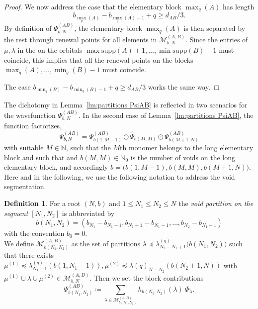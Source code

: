 \documentclass[letterpaper, DIV=17]{scrartcl}
\numberwithin{equation}{section}
\theoremstyle{definition}
\newtheorem{defn}{Definition}[section]
\begin{document}
\begin{proof}
	We now address the case that the elementary block $ \max_q(A) $ has length
	$$ b_{\max_q(A)}-b_{\max_q(A)-1}+q\geq d_{AB}/3. $$
	By definition of $\Psi_{b,N}^{(AB)}$, the elementary block $\max_q(A)$ is then separated by the rest through renewal points for all elements in $\mathcal{M}_{b,N}^{(A,B)}$. Since the entries of $\mu, \lambda$ in the on the orbitals $ \max \mathrm{supp}(A)+1, \dots ,  \min \mathrm{supp}(B)-1$ must coincide, this implies that all the renewal points on the blocks $\max_q(A), \dots , \min_q(B)-1$ must coincide.
	
	The case $ b_{\min_q(B)}-b_{\min_q(B)-1}+q\geq d_{AB}/3 $ works the same way.
\end{proof}

The dichotomy in Lemma~\ref{lm:partitions PsiAB} is reflected in two scenarios for the wavefunction $\Psi_{b, N}^{(AB)}$. In the second case of Lemma~\ref{lm:partitions PsiAB}, the function factorizes,
\begin{equation}\label{eq:longblockfactor}
\Psi_{b, N}^{(AB)} = \Psi_{b(1,M-1)}^{(AB)} \odot  \widehat \Psi_{ b(M,M)}  \odot \Psi_{b(M+1,N)}^{(AB)}
\end{equation}
with suitable $ M\in \mathbb{N} $, such that the $ M $th monomer belongs to the long elementary block and such that and $ b(M,M) \in \mathbb{N}_0 $ is the number of voids on the long elementary block, and accordingly $ b = \big(b(1,M-1), b(M,M) , b(M+1,N) )  $. Here and in the following, we 
use the following notation to address the void segmentation.
\begin{defn}
 For a root $ (N,b) $ and $1\leq N_1\leq N_2\leq N$ the \emph{void partition on the segment $ [N_1,N_2] $} is abbreviated by
\begin{equation}
	b(N_1, N_2) = (b_{N_1}-b_{N_1-1}, b_{N_1+1}-b_{N_1-1}, \dots, b_{N_2}-b_{N_1-1})
\end{equation}
with the convention $b_0=0$.\\
We define $\mathcal{M}_{b(N_1, N_2)}^{(A,B)}$ as the set of partitions $\lambda\preceq \lambda^{(q)}_{N_2-N_1+1}\big(b(N_1,N_2)\big) $ such that there exists $\mu^{(1)}\preceq \lambda^{(q)}_{N_1-1}(b(1,N_1-1)), \mu^{(2)}\preceq \lambda{(q)}_{N-N_2}(b(N_2+1,N)) $ with  $\mu^{(1)}\cup \lambda \cup \mu^{(2)} \in \mathcal{M}_{b,N}^{(A,B)}$. Then we set the block contributions
\begin{equation}
	\Psi_{b(N_1,N_2)}^{(AB)} \coloneqq \sum_{\lambda \in \mathcal{M}_{b(N_1, N_2)}^{(A,B)}} h_{b(N_1, N_2)}(\lambda) \ \Phi_{\lambda} . 
\end{equation}
\end{defn}
\end{document}
